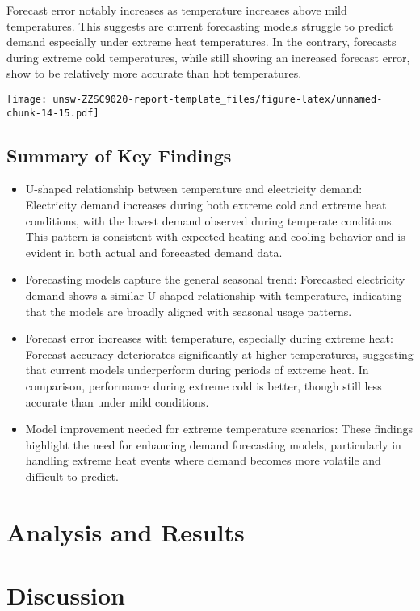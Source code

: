 \documentclass[mstat,12pt,a4paper]{unswthesis}
\begin{document}
Forecast error notably increases as temperature increases above mild
temperatures. This suggests are current forecasting models struggle to
predict demand especially under extreme heat temperatures. In the
contrary, forecasts during extreme cold temperatures, while still
showing an increased forecast error, show to be relatively more accurate
than hot temperatures.

\texttt{[image: unsw-ZZSC9020-report-template\_files/figure-latex/unnamed-chunk-14-15.pdf]}

\section{Summary of Key Findings}\label{summary-of-key-findings}

\begin{itemize}
\item
  U-shaped relationship between temperature and electricity demand:
  Electricity demand increases during both extreme cold and extreme heat
  conditions, with the lowest demand observed during temperate
  conditions. This pattern is consistent with expected heating and
  cooling behavior and is evident in both actual and forecasted demand
  data.
\item
  Forecasting models capture the general seasonal trend: Forecasted
  electricity demand shows a similar U-shaped relationship with
  temperature, indicating that the models are broadly aligned with
  seasonal usage patterns.
\item
  Forecast error increases with temperature, especially during extreme
  heat: Forecast accuracy deteriorates significantly at higher
  temperatures, suggesting that current models underperform during
  periods of extreme heat. In comparison, performance during extreme
  cold is better, though still less accurate than under mild conditions.
\item
  Model improvement needed for extreme temperature scenarios: These
  findings highlight the need for enhancing demand forecasting models,
  particularly in handling extreme heat events where demand becomes more
  volatile and difficult to predict.
\end{itemize}

\chapter{Analysis and Results}\label{analysis-and-results}

\chapter{Discussion}\label{discussion}
\end{document}
